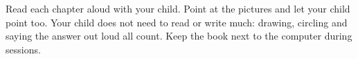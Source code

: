\documentclass[track=junior,level=1]{kidscode}
\begin{document}

\begin{grownup}
Read each chapter aloud with your child. Point at the pictures and let your child point too.
Your child does not need to read or write much: drawing, circling and saying the answer out
loud all count. Keep the book next to the computer during sessions.
\end{grownup}
\kcweeklytoc
{}
\end{document}
